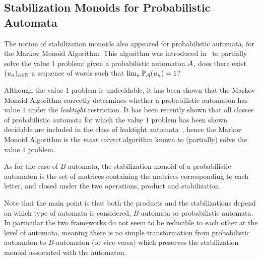 \subsection{Stabilization Monoids for Probabilistic Automata}

The notion of stabilization monoids also appeared for probabilistic automata, for the Markov Monoid Algorithm.
This algorithm was introduced in~\cite{FGO12} to partially solve the value $1$ problem: given a probabilistic automaton $\mathcal{A}$,
does there exist $(u_n)_{n \in \mathbb{N}}$ a sequence of words such that $\lim_n \mathbb{P}_{\mathcal{A}}(u_n) = 1$?

Although the value $1$ problem is undecidable, it has been shown that
the Markov Monoid Algorithm correctly determines whether a probabilistic automaton has value $1$
under the \textit{leaktight} restriction.
It has been recently shown that all classes of probabilistic automata for which the value $1$ problem has been shown decidable 
are included in the class of leaktight automata~\cite{FGKO14},
hence the Markov Monoid Algorithm is the \textit{most correct} algorithm known to (partially) solve the value $1$ problem.

As for the case of $B$-automata, the stabilization monoid of a probabilistic automaton
is the set of matrices containing the matrices corresponding to each letter,
and closed under the two operations, product and stabilization.

Note that the main point is that both the products and the stabilizations depend on which type of automata is considered,
$B$-automata or probabilistic automata. In particular the two frameworks do not seem to be reducible to each other at the level of automata, meaning there is no simple transformation from probabilistic automaton to $B$-automaton (or vice-versa) which preserves the stabilization monoid associated with the automaton.
